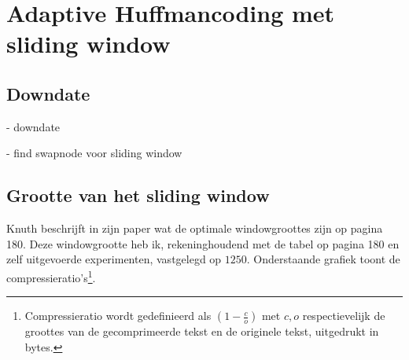 \section{Adaptive Huffmancoding met sliding window}

\subsection{Downdate}
- downdate

- find swapnode voor sliding window

\subsection{Grootte van het sliding window}
Knuth beschrijft in zijn paper \cite{knuthhuffman} wat de optimale windowgroottes zijn op pagina 180. Deze windowgrootte heb ik, rekeninghoudend met de tabel op pagina 180 en zelf uitgevoerde experimenten, vastgelegd op $1250$. Onderstaande grafiek toont de compressieratio's\footnote{Compressieratio wordt gedefinieerd als $(1-\frac{c}{o})$ met $c,o$ respectievelijk de groottes van de gecomprimeerde tekst en de originele tekst, uitgedrukt in bytes.}.
